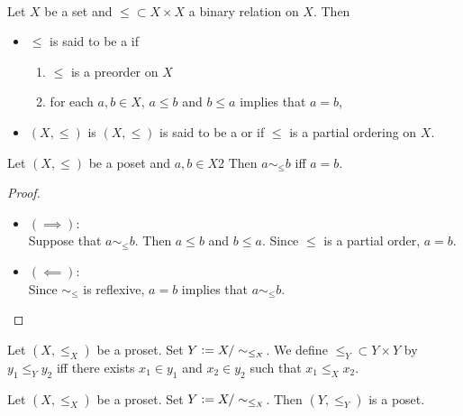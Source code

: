 \documentclass{book}
\begin{document}
	\begin{defn}   \\
		Let $X$ be a set and ${\leq}  \subset X \times X$ a binary relation on $X$. Then 
		\begin{itemize}
			\item $\leq$ is said to be a  if 
			\begin{enumerate}
				\item $\leq$ is a preorder on $X$
				\item for each $a,b \in X$, $a \leq b$ and $b \leq a$ implies that $a = b$,
			\end{enumerate}
			\item $(X, \leq)$ is $(X, \leq)$ is said to be a  or  if
			$\leq$ is a partial ordering on $X$.
		\end{itemize}
	\end{defn}
	
	\begin{ex} 
		Let $(X, \leq)$ be a poset and $a,b \in X$2 Then $a \sim_{\leq} b$ iff $a = b$. 
	\end{ex}
	
	\begin{proof}\
		\begin{itemize}
			\item $(\implies)$: \\
			Suppose that $a \sim_{\leq} b$. Then $a \leq b$ and $b \leq a$. Since $\leq$ is a partial order, $a = b$. 
			\item $(\impliedby)$: \\
			Since $\sim_{\leq}$ is reflexive, $a = b$ implies that $a \sim_{\leq} b$. 
		\end{itemize}
	\end{proof}
	
	\begin{defn} 
		Let $(X, \leq_X)$ be a proset. Set $Y \vcentcolon= X /\sim_{\leq_X}$. We define $\leq_Y \subset Y \times Y$ by $y_1 \leq_Y y_2$ iff there exists $x_1 \in y_1$ and $x_2 \in y_2$ such that $x_1 \leq_X x_2$.
	\end{defn}
	
	\begin{ex} 
		Let $(X, \leq_X)$ be a proset. Set $Y \vcentcolon= X /\sim_{\leq_X}$. Then $(Y, \leq_Y)$ is a poset. 
	\end{ex}
	
\end{document}
